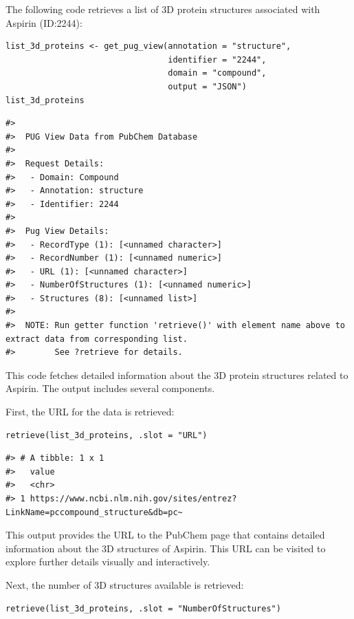 The following code retrieves a list of 3D protein structures associated with Aspirin (ID:2244):

\begin{verbatim}
list_3d_proteins <- get_pug_view(annotation = "structure", 
                                 identifier = "2244", 
                                 domain = "compound", 
                                 output = "JSON")
list_3d_proteins
\end{verbatim}

\begin{verbatim}
#> 
#>  PUG View Data from PubChem Database 
#> 
#>  Request Details:  
#>   - Domain: Compound
#>   - Annotation: structure
#>   - Identifier: 2244
#> 
#>  Pug View Details: 
#>   - RecordType (1): [<unnamed character>] 
#>   - RecordNumber (1): [<unnamed numeric>] 
#>   - URL (1): [<unnamed character>] 
#>   - NumberOfStructures (1): [<unnamed numeric>] 
#>   - Structures (8): [<unnamed list>] 
#> 
#>  NOTE: Run getter function 'retrieve()' with element name above to extract data from corresponding list. 
#>        See ?retrieve for details.
\end{verbatim}

This code fetches detailed information about the 3D protein structures related to Aspirin. The output includes several components.

First, the URL for the data is retrieved:

\begin{verbatim}
retrieve(list_3d_proteins, .slot = "URL")
\end{verbatim}

\begin{verbatim}
#> # A tibble: 1 x 1
#>   value                                                                         
#>   <chr>                                                                         
#> 1 https://www.ncbi.nlm.nih.gov/sites/entrez?LinkName=pccompound_structure&db=pc~
\end{verbatim}

This output provides the URL to the PubChem page that contains detailed information about the 3D structures of Aspirin. This URL can be visited to explore further details visually and interactively.

Next, the number of 3D structures available is retrieved:

\begin{verbatim}
retrieve(list_3d_proteins, .slot = "NumberOfStructures")
\end{verbatim}

